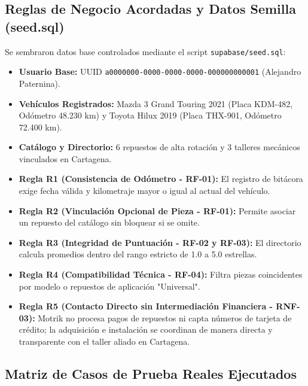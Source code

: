 \documentclass[11pt,letterpaper]{article}
\begin{document}
\subsection{Reglas de Negocio Acordadas y Datos Semilla (seed.sql)}
Se sembraron datos base controlados mediante el script \texttt{supabase/seed.sql}:
\begin{itemize}
    \item \textbf{Usuario Base:} UUID \texttt{a0000000-0000-0000-0000-000000000001} (Alejandro Paternina).
    \item \textbf{Vehículos Registrados:} Mazda 3 Grand Touring 2021 (Placa KDM-482, Odómetro 48.230 km) y Toyota Hilux 2019 (Placa THX-901, Odómetro 72.400 km).
    \item \textbf{Catálogo y Directorio:} 6 repuestos de alta rotación y 3 talleres mecánicos vinculados en Cartagena.
    \item \textbf{Regla R1 (Consistencia de Odómetro - RF-01):} El registro de bitácora exige fecha válida y kilometraje mayor o igual al actual del vehículo.
    \item \textbf{Regla R2 (Vinculación Opcional de Pieza - RF-01):} Permite asociar un repuesto del catálogo sin bloquear si se omite.
    \item \textbf{Regla R3 (Integridad de Puntuación - RF-02 y RF-03):} El directorio calcula promedios dentro del rango estricto de 1.0 a 5.0 estrellas.
    \item \textbf{Regla R4 (Compatibilidad Técnica - RF-04):} Filtra piezas coincidentes por modelo o repuestos de aplicación "Universal".
    \item \textbf{Regla R5 (Contacto Directo sin Intermediación Financiera - RNF-03):} Motrik no procesa pagos de repuestos ni capta números de tarjeta de crédito; la adquisición e instalación se coordinan de manera directa y transparente con el taller aliado en Cartagena.
\end{itemize}

\subsection{Matriz de Casos de Prueba Reales Ejecutados}
\end{document}
